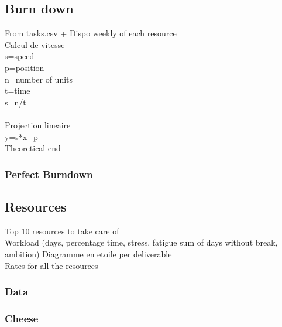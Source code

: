 \documentclass[8pt]{article} %
\begin{document}
\subsection{Burn down}
From tasks.csv + Dispo weekly of each resource
\\
Calcul de vitesse\\
s=speed\\
p=position\\
n=number of units\\
t=time\\
s=n/t\\
\\
Projection lineaire\\
y=s*x+p\\
Theoretical end\\




\subsubsection{Perfect Burndown}
%


%

\subsection{Resources}

Top 10 resources to take care of\\
Workload (days, percentage time, stress, fatigue sum of days without break, ambition)
Diagramme en etoile per deliverable\\
Rates for all the resources

\subsubsection{Data}

%
\subsubsection{Cheese}

\end{document}
